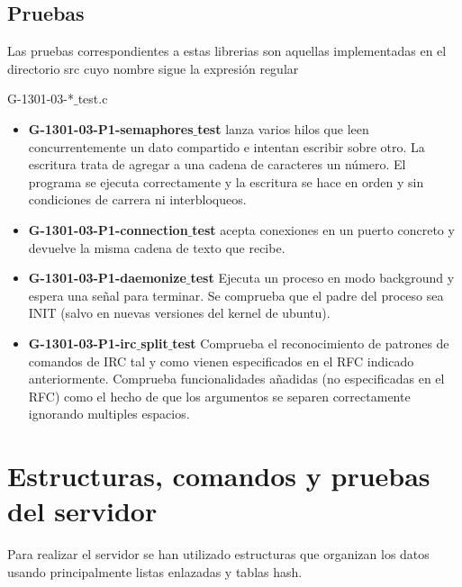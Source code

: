 \documentclass{mathnotes}
\begin{document}
\subsection{Pruebas}
Las pruebas correspondientes a estas librerias son aquellas implementadas en el directorio src cuyo nombre sigue la expresión regular
\begin{center}
G-1301-03-*$\_$test.c
\end{center}
\begin{itemize}
\item \textbf{G-1301-03-P1-semaphores$\_$test} lanza varios hilos que leen concurrentemente un dato compartido e intentan escribir sobre otro. La escritura trata de agregar a una cadena de caracteres un número. El programa se ejecuta correctamente y la escritura se hace en orden y sin condiciones de carrera ni interbloqueos.
\item \textbf{G-1301-03-P1-connection$\_$test} acepta conexiones en un puerto concreto y devuelve la misma cadena de texto que recibe.
\item \textbf{G-1301-03-P1-daemonize$\_$test} Ejecuta un proceso en modo background y espera una señal para terminar. Se comprueba que el padre del proceso sea INIT (salvo en nuevas versiones del kernel de ubuntu).
\item \textbf{G-1301-03-P1-irc$\_$split$\_$test} Comprueba el reconocimiento de patrones de comandos de IRC tal y como vienen especificados en el RFC indicado anteriormente. Comprueba funcionalidades añadidas (no especificadas en el RFC) como el hecho de que los argumentos se separen correctamente ignorando multiples espacios.
\end{itemize}

\section{Estructuras, comandos y pruebas del servidor}
Para realizar el servidor se han utilizado estructuras que organizan los datos usando principalmente listas enlazadas y tablas hash.
\end{document}
